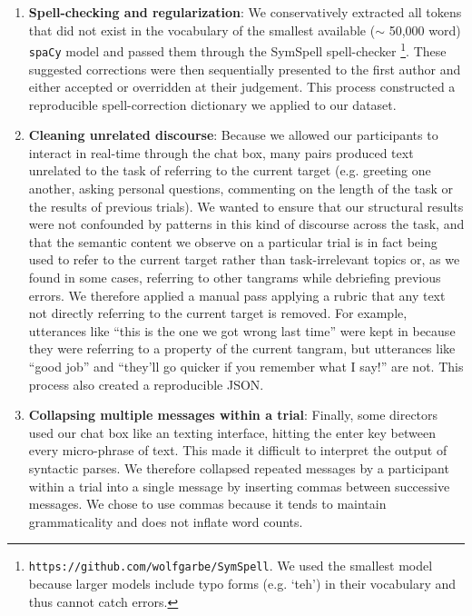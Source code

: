 \documentclass[alpha-refs]{wiley-article}
\begin{document}
\begin{enumerate}

\item \textbf{Spell-checking and regularization}: We conservatively extracted all tokens that did not exist in the vocabulary of the smallest available ($\sim$ 50,000 word) \texttt{spaCy} model and passed them through the SymSpell spell-checker \footnote{\texttt{https://github.com/wolfgarbe/SymSpell}. We used the smallest model because larger models include typo forms (e.g. `teh') in their vocabulary and thus cannot catch errors.}. These suggested corrections were then sequentially presented to the first author and either accepted or overridden at their judgement. This process constructed a reproducible spell-correction dictionary we applied to our dataset.

\item \textbf{Cleaning unrelated discourse}: Because we allowed our participants to interact in real-time through the chat box, many pairs produced text unrelated to the task of referring to the current target (e.g. greeting one another, asking personal questions, commenting on the length of the task or the results of previous trials). We wanted to ensure that our structural results were not confounded by patterns in this kind of discourse across the task, and that the semantic content we observe on a particular trial is in fact being used to refer to the current target rather than task-irrelevant topics or, as we found in some cases, referring to other tangrams while debriefing previous errors. We therefore applied a manual pass applying a rubric that any text not directly referring to the current target is removed. For example, utterances like ``this is the one we got wrong last time'' were kept in because they were referring to a property of the current tangram, but utterances like ``good job'' and ``they'll go quicker if you remember what I say!'' are not. This process also created a reproducible JSON.

\item \textbf{Collapsing multiple messages within a trial}: Finally, some directors used our chat box like an texting interface, hitting the enter key between every micro-phrase of text. This made it difficult to interpret the output of syntactic parses. We therefore collapsed repeated messages by a participant within a trial into a single message by inserting commas between successive messages. We chose to use commas because it tends to maintain grammaticality and does not inflate word counts.

\end{enumerate}
\end{document}
